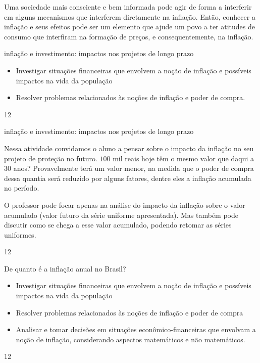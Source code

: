 Uma sociedade mais consciente e bem informada pode agir de forma a interferir em alguns mecanismos que interferem diretamente na inflação. Então, conhecer a inflação e seus efeitos pode ser um elemento que ajude um povo a ter atitudes de consumo que interfiram na formação de preços, e consequentemente, na inflação.

\clearpage
\def\currentcolor{session2}
\begin{objectives}{inflação e investimento: impactos nos projetos de longo prazo}
{
\begin{itemize}
\item Investigar situações financeiras que envolvem a noção de inflação e possíveis impactos na vida da população
\item Resolver problemas relacionados às noções de inflação e poder de compra.
\end{itemize}

}{1}{2}
\end{objectives}
\marginpar{\vspace{-2.5em}}
\begin{sugestions}{inflação e investimento: impactos nos projetos de longo prazo}
{
Nessa atividade convidamos o aluno a pensar sobre o impacto da inflação no seu projeto de proteção no futuro. $100$ mil reais hoje têm o mesmo valor que daqui a 30 anos? Provavelmente terá um valor menor, na medida que o poder de compra dessa quantia será reduzido por alguns fatores, dentre eles a inflação acumulada no período.

O professor pode focar apenas na análise do impacto da inflação sobre o valor acumulado (valor futuro da série uniforme apresentada). Mas também pode discutir como se chega a esse valor acumulado, podendo retomar as séries uniformes. 

}{1}{2}
\end{sugestions}
\marginpar{\vspace{-1em}}
\begin{objectives}{De quanto é a inflação anual no Brasil?}
{
\begin{itemize}
\item Investigar situações financeiras que envolvem a noção de inflação e possíveis impactos na vida da população
\item Resolver problemas relacionados às noções de inflação e poder de compra
\item Analisar e tomar decisões em situações econômico-financeiras que envolvam a noção de inflação, considerando aspectos matemáticos e não matemáticos.
\end{itemize}
}{1}{2}
\end{objectives}
